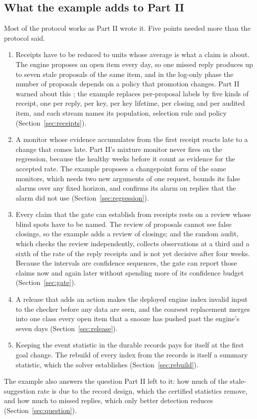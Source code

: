 \documentclass[11pt]{article}
\theoremstyle{definition}
\theoremstyle{plain}
\begin{document}
\subsection{What the example adds to Part II}

Most of the protocol works as Part II wrote it. Five points needed more than the protocol said.
\begin{enumerate}
\item Receipts have to be reduced to units whose average is what a claim is about. The engine
  proposes an open item every day, so one missed reply produces up to seven stale proposals of the
  same item, and in the log-only phase the number of proposals depends on a policy that promotion
  changes. Part II warned about this \cite[Section~5.2]{part2}; the example replaces per-proposal
  labels by five kinds of receipt, one per reply, per key, per key lifetime, per closing and per
  audited item, and each stream names its population, selection rule and policy
  (Section~\ref{sec:receipts}).
\item A monitor whose evidence accumulates from the first receipt reacts late to a change that
  comes late. Part II's mixture monitor never fires on the regression, because the healthy weeks
  before it count as evidence for the accepted rate. The example proposes a changepoint form of the
  same monitors, which needs two new arguments of one request, bounds its false alarms over any
  fixed horizon, and confirms its alarm on replies that the alarm did not use
  (Section~\ref{sec:regression}).
\item Every claim that the gate can establish from receipts rests on a review whose blind spots
  have to be named. The review of proposals cannot see false closings, so the example adds a review
  of closings; and the random audit, which checks the review independently, collects observations
  at a third and a sixth of the rate of the reply receipts and is not yet decisive after four
  weeks. Because the intervals are confidence sequences, the gate can report those claims now and
  again later without spending more of its confidence budget (Section~\ref{sec:gate}).
\item A release that adds an action makes the deployed engine index invalid input to the checker
  before any data are seen, and the coarsest replacement merges into one class every open item
  that a snooze has pushed past the engine's seven days (Section~\ref{sec:release}).
\item Keeping the event statistic in the durable records pays for itself at the first goal change.
  The rebuild of every index from the records is itself a summary statistic, which the solver
  establishes (Section~\ref{sec:rebuild}).
\end{enumerate}
The example also answers the question Part II left to it: how much of the stale-suggestion rate is
due to the record design, which the certified statistics remove, and how much to missed replies,
which only better detection reduces (Section~\ref{sec:question}).
\end{document}
